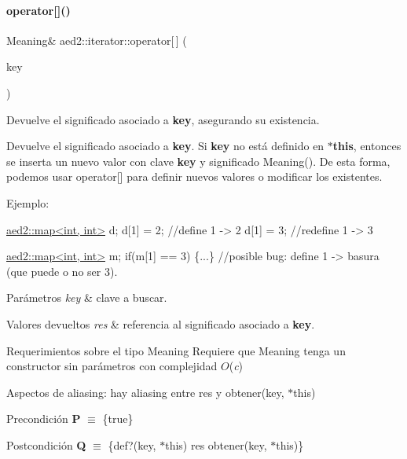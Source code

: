 \paragraph{\texorpdfstring{operator[]()}{operator[]()}}
{\footnotesize\ttfamily Meaning\& aed2\+::iterator\+::operator\mbox{[}$\,$\mbox{]} (\begin{DoxyParamCaption}\item[{const Key \&}]{key }\end{DoxyParamCaption})\hspace{0.3cm}{\ttfamily [inline]}}



Devuelve el significado asociado a {\bfseries key}, asegurando su existencia. 

Devuelve el significado asociado a {\bfseries key}. Si {\bfseries key} no está definido en {\bfseries $\ast$this}, entonces se inserta un nuevo valor con clave {\bfseries key} y significado Meaning(). De esta forma, podemos usar {\ttfamily operator\mbox{[}\mbox{]}} para definir nuevos valores o modificar los existentes.

Ejemplo\+: 
\begin{DoxyCode}
\hyperlink{classaed2_1_1map}{aed2::map<int, int>} d;
d[1] = 2;      \textcolor{comment}{//define 1 -> 2}
d[1] = 3;      \textcolor{comment}{//redefine 1 -> 3}

\hyperlink{classaed2_1_1map}{aed2::map<int, int>} m;
\textcolor{keywordflow}{if}(m[1] == 3) \{...\} \textcolor{comment}{//posible bug: define 1 -> basura (que puede o no ser 3).}
\end{DoxyCode}



\begin{DoxyParams}{Parámetros}
{\em key} & clave a buscar. \\
\hline
\end{DoxyParams}

\begin{DoxyRetVals}{Valores devueltos}
{\em res} & referencia al significado asociado a {\bfseries key}.\\
\hline
\end{DoxyRetVals}
\begin{DoxyParagraph}{Requerimientos sobre el tipo Meaning}
Requiere que Meaning tenga un constructor sin parámetros con complejidad $O$({\itshape c})
\end{DoxyParagraph}
\begin{DoxyParagraph}{Aspectos de aliasing\+:}
hay aliasing entre res y obtener(key, $\ast$this)
\end{DoxyParagraph}
\begin{DoxyPrecond}{Precondición}
{\bfseries P} $\equiv$ \{true\} 
\end{DoxyPrecond}
\begin{DoxyPostcond}{Postcondición}
{\bfseries Q} $\equiv$ \{def?(key, $\ast$this)  res  obtener(key, $\ast$this)\}
\end{DoxyPostcond}

